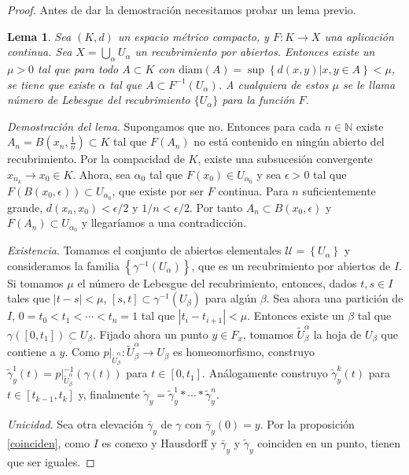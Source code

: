 \documentclass[12pt,a4paper]{book}
\newtheorem{lema}{Lema}
\theoremstyle{definition} \newtheorem{defn}[thm]{Definición}
\theoremstyle{definition} \newtheorem{ejemplo}[thm]{Ejemplo}
\theoremstyle{definition} \newtheorem{ejercicio}[thm]{Ejercicio}
\theoremstyle{remark} \newtheorem*{obs}{Observación}
\begin{document}
\begin{proof}
Antes de dar la demostración necesitamos probar un lema previo.
\begin{lema}
  Sea $(K,d)$ un espacio métrico compacto, y $F:K\rightarrow X$ una aplicación continua. Sea $X=\bigcup_{\alpha}U_{\alpha}$ un recubrimiento por abiertos. Entonces existe un $\mu >0$ tal que para todo $A\subset K$ con $\mathrm{diam}(A)=\sup\left\{ d(x,y)|x,y \in A \right\}<\mu$, se tiene que existe $\alpha$ tal que $A\subset F^{-1}(U_{\alpha})$. A cualquiera de estos $\mu$ se le llama \emph{número de Lebesgue del recubrimiento $\{U_\alpha\}$ para la función $F$}.
\end{lema}

\textit{Demostración del lema}. Supongamos que no. Entonces para cada $n\in \mathbb{N}$ existe $A_n=B(x_n,\tfrac{1}{n})\subset K$ tal que $F(A_n)$ no está contenido en ningún abierto del recubrimiento. Por la compacidad de $K$, existe una subsucesión convergente $x_{n_k}\rightarrow x_0 \in K$. Ahora, sea $\alpha_0$ tal que $F(x_0)\in U_{\alpha_0}$ y sea $\epsilon>0$ tal que $F(B(x_0,\epsilon))\subset U_{\alpha_0}$, que existe por ser $F$ continua. Para $n$ suficientemente grande, $d(x_n,x_0)<\epsilon/2$ y $1/n<\epsilon/2$. Por tanto $A_n\subset B(x_0,\epsilon)$ y $F(A_n) \subset U_{\alpha_0}$ y llegaríamos a una contradicción.

  \textit{Existencia}. Tomamos el conjunto de abiertos elementales $\mathcal{U}=\left\{ U_{\alpha} \right\}$ y consideramos la familia $\left\{ \gamma^{-1}(U_{\alpha}) \right\}$, que es un recubrimiento por abiertos de $I$. Si tomamos $\mu$ el número de Lebesgue del recubrimiento, entonces, dados $t,s \in I$ tales que $|t-s|<\mu$, $[s,t]\subset \gamma^{-1}(U_{\beta})$ para algún $\beta$. Sea ahora una partición de $I$, $0=t_0<t_1<\cdots<t_n=1$ tal que $|t_i-t_{i+1}|<\mu$. Entonces existe un $\beta$ tal que $\gamma([0,t_1])\subset U_{\beta}$. Fijado ahora un punto $y\in F_{x}$, tomamos $\tilde{U}_{\beta}^{\alpha}$ la hoja de $U_{\beta}$ que contiene a $y$. Como $p|_{\tilde{U}_{\beta}^{\alpha}}:\tilde{U}_{\beta}^{\alpha}\rightarrow U_{\beta}$ es homeomorfismo, construyo $\tilde{\gamma}_{y}^1(t)=p|_{\tilde{U}_{\beta}^{\alpha}}^{-1}(\gamma(t))$ para $t\in[0,t_1]$. Análogamente construyo $\tilde{\gamma}_{y}^k(t)$ para $t\in[t_{k-1},t_k]$ y, finalmente $\tilde{\gamma}_{y}=\tilde{\gamma}_{y}^1*\cdots*\tilde{\gamma}_{y}^n$.

  \textit{Unicidad}. Sea otra elevación $\bar{\gamma}_y$ de $\gamma$ con $\bar{\gamma}_y(0)=y$. Por la proposición \ref{coinciden}, como $I$ es conexo y Hausdorff y $\bar{\gamma}_y$ y $\tilde{\gamma}_y$ coinciden en un punto, tienen que ser iguales.
\end{proof}
\end{document}
